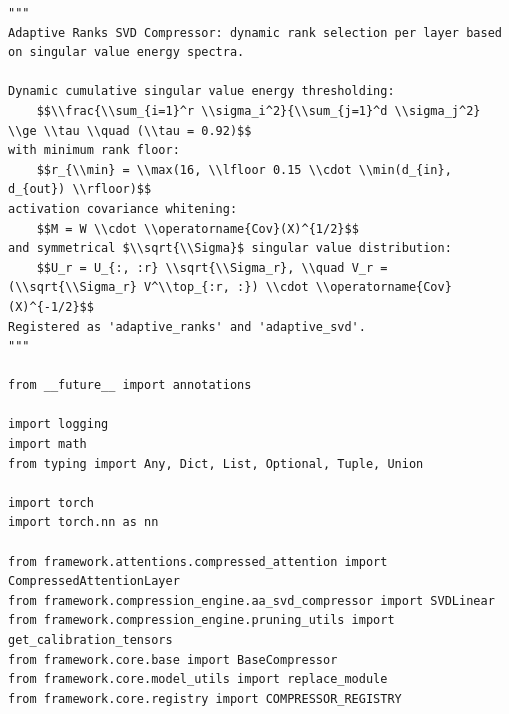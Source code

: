 \begin{lstlisting}
"""
Adaptive Ranks SVD Compressor: dynamic rank selection per layer based on singular value energy spectra.

Dynamic cumulative singular value energy thresholding:
    $$\\frac{\\sum_{i=1}^r \\sigma_i^2}{\\sum_{j=1}^d \\sigma_j^2} \\ge \\tau \\quad (\\tau = 0.92)$$
with minimum rank floor:
    $$r_{\\min} = \\max(16, \\lfloor 0.15 \\cdot \\min(d_{in}, d_{out}) \\rfloor)$$
activation covariance whitening:
    $$M = W \\cdot \\operatorname{Cov}(X)^{1/2}$$
and symmetrical $\\sqrt{\\Sigma}$ singular value distribution:
    $$U_r = U_{:, :r} \\sqrt{\\Sigma_r}, \\quad V_r = (\\sqrt{\\Sigma_r} V^\\top_{:r, :}) \\cdot \\operatorname{Cov}(X)^{-1/2}$$
Registered as 'adaptive_ranks' and 'adaptive_svd'.
"""

from __future__ import annotations

import logging
import math
from typing import Any, Dict, List, Optional, Tuple, Union

import torch
import torch.nn as nn

from framework.attentions.compressed_attention import CompressedAttentionLayer
from framework.compression_engine.aa_svd_compressor import SVDLinear
from framework.compression_engine.pruning_utils import get_calibration_tensors
from framework.core.base import BaseCompressor
from framework.core.model_utils import replace_module
from framework.core.registry import COMPRESSOR_REGISTRY


\end{lstlisting}
